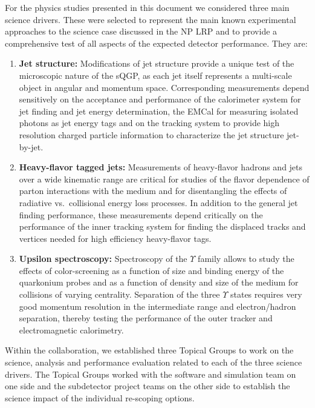 For the physics studies presented in this document we considered three
main science drivers. These were selected to represent the main known 
experimental approaches to the science case discussed in the NP LRP and
to provide a comprehensive test of all aspects of the expected detector
performance. They are:
\begin{enumerate}
\item {\bf Jet structure:} Modifications of jet structure provide a unique test
of the microscopic nature of the sQGP, as each jet itself represents a multi-scale
object in angular and momentum space. Corresponding measurements depend
sensitively on the acceptance and performance 
of the calorimeter system for jet finding and jet energy determination, the
EMCal for measuring isolated photons as jet energy tags and on the tracking
system to provide high resolution charged particle information to characterize
the jet structure jet-by-jet.
\item {\bf Heavy-flavor tagged jets:} Measurements of heavy-flavor hadrons 
and jets over a wide kinematic range are critical for studies of
the flavor dependence of parton interactions with the medium and for 
disentangling the effects of radiative vs.\ collisional energy loss processes.
In addition to the general jet finding performance, these measurements depend 
critically on the performance of the inner tracking system for finding the displaced 
tracks and vertices needed for high efficiency heavy-flavor tags.
\item {\bf Upsilon spectroscopy:} Spectroscopy of the $\Upsilon$ family allows
to study the effects of color-screening as a function of size and 
binding energy of the quarkonium probes and as a function of density and size
of the medium for collisions of varying centrality. Separation of the three 
$\Upsilon$ states requires very good momentum resolution in the intermediate
\pt range and electron/hadron separation, thereby testing the performance of 
the outer tracker and electromagnetic calorimetry. 
\end{enumerate}

Within the collaboration, we established three Topical Groups to work 
on the science, analysis and performance evaluation related to each of the 
three science drivers. The Topical Groups worked with the software and simulation
team on one side and the subdetector project teams on the other side to 
establish the science impact of the individual re-scoping options.





